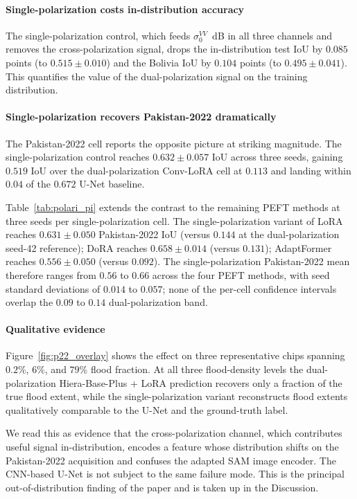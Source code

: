 \documentclass[conference]{IEEEtran}
\begin{document}
\paragraph{Single-polarization costs in-distribution accuracy}
The single-polarization control, which feeds $\sigma_0^{VV}$~dB in all three channels and removes the cross-polarization signal, drops the in-distribution test IoU by $0.085$ points (to $0.515 \pm 0.010$) and the Bolivia IoU by $0.104$ points (to $0.495 \pm 0.041$). This quantifies the value of the dual-polarization signal on the training distribution.

\paragraph{Single-polarization recovers Pakistan-2022 dramatically}
The Pakistan-2022 cell reports the opposite picture at striking magnitude. The single-polarization control reaches $0.632 \pm 0.057$ IoU across three seeds, gaining $0.519$ IoU over the dual-polarization Conv-LoRA cell at $0.113$ and landing within $0.04$ of the $0.672$ U-Net baseline.

Table~\ref{tab:polari_pi} extends the contrast to the remaining PEFT methods at three seeds per single-polarization cell. The single-polarization variant of LoRA reaches $0.631 \pm 0.050$ Pakistan-2022 IoU (versus $0.144$ at the dual-polarization seed-42 reference); DoRA reaches $0.658 \pm 0.014$ (versus $0.131$); AdaptFormer reaches $0.556 \pm 0.050$ (versus $0.092$). The single-polarization Pakistan-2022 mean therefore ranges from $0.56$ to $0.66$ across the four PEFT methods, with seed standard deviations of $0.014$ to $0.057$; none of the per-cell confidence intervals overlap the $0.09$ to $0.14$ dual-polarization band.

\paragraph{Qualitative evidence}
Figure~\ref{fig:p22_overlay} shows the effect on three representative chips spanning $0.2\%$, $6\%$, and $79\%$ flood fraction. At all three flood-density levels the dual-polarization Hiera-Base-Plus + LoRA prediction recovers only a fraction of the true flood extent, while the single-polarization variant reconstructs flood extents qualitatively comparable to the U-Net and the ground-truth label.

We read this as evidence that the cross-polarization channel, which contributes useful signal in-distribution, encodes a feature whose distribution shifts on the Pakistan-2022 acquisition and confuses the adapted SAM image encoder. The CNN-based U-Net is not subject to the same failure mode. This is the principal out-of-distribution finding of the paper and is taken up in the Discussion.
\end{document}
